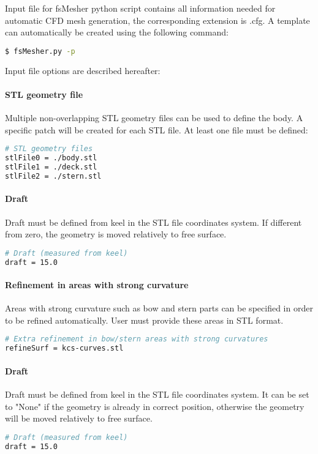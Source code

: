 Input file for fsMesher python script contains all information needed for automatic CFD mesh generation, the corresponding extension is .cfg. A template can automatically be created using the following command:
\begin{lstlisting}[language=bash]
$ fsMesher.py -p
\end{lstlisting}

Input file options are described hereafter:
\paragraph{STL geometry file}
Multiple non-overlapping STL geometry files can be used to define the body. A specific patch will be created for each STL file. At least one file must be defined:
\begin{lstlisting}[language=bash]
# STL geometry files
stlFile0 = ./body.stl
stlFile1 = ./deck.stl
stlFile2 = ./stern.stl
\end{lstlisting}

\paragraph{Draft}
Draft must be defined from keel in the STL file coordinates system. If different from zero, the geometry is moved relatively to free surface.
\begin{lstlisting}[language=bash]
# Draft (measured from keel)
draft = 15.0
\end{lstlisting}

\paragraph{Refinement in areas with strong curvature}
Areas with strong curvature such as bow and stern parts can be specified in order to be refined automatically. User must provide these areas in STL format.
\begin{lstlisting}[language=bash]
# Extra refinement in bow/stern areas with strong curvatures
refineSurf = kcs-curves.stl
\end{lstlisting}

\paragraph{Draft}
Draft must be defined from keel in the STL file coordinates system. It can be set to "None" if the geometry is already in correct position, otherwise the geometry will be moved relatively to free surface.
\begin{lstlisting}[language=bash]
# Draft (measured from keel)
draft = 15.0
\end{lstlisting}

